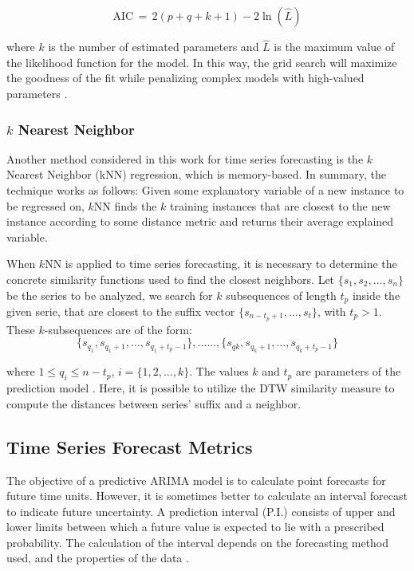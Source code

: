\begin{equation}
\mathrm{AIC} \, = \, 2(p + q+ k + 1)-2\ln(\hat L)
\end{equation}

where $k$ is the number of estimated parameters and $\hat{L}$ is the maximum value of the likelihood function for the model. In this way, the grid search will maximize the goodness of the fit while penalizing complex models with high-valued parameters \cite{Hyndman2018}.

\subsubsection{$k$ Nearest Neighbor}
\label{Sec:TheorykNN}

Another method considered in this work for time series forecasting is the $k$ Nearest Neighbor (kNN) regression, which is memory-based. In summary, the technique works as follows: Given some explanatory variable of a new instance to be regressed on, $k$NN finds the $k$ training instances that are closest to the new instance according to some distance metric and returns their average explained variable.

When $k$NN is applied to time series forecasting, it is necessary to determine the concrete similarity functions used to find the closest neighbors. Let $\{s_{1}, s_{2}, \ldots, s_{n}\}$ be the series to be analyzed, we search for $k$ subsequences of length $t_p$ inside the given serie, that are closest to the suffix vector $\{s_{n-t_{p}+1},\ldots, s_{t}\}$, with $t_{p} >1$. These $k$-subsequences are of the form: 
\begin{equation*}
    \{s_{q_{1}}, s_{q_{1}+1}, \ldots, s_{q_{1}+t_{p}-1} \}, \ldots \ldots, \{s_{q{k}}, s_{q_{k}+1}, \ldots, s_{q_{k} + t_{p}-1} \}
\end{equation*}

where $1 \leq q_{i} \leq n-t_{p}$, $i = \{1, 2, \ldots, k\}$. The values $k$ and $t_{p}$ are parameters of the prediction model \cite{Ban2013}. Here, it is possible to utilize the DTW similarity measure to compute the distances between series' suffix and a neighbor.

\subsection{Time Series Forecast Metrics}
\label{Sec:ErrorTSA}
The objective of a predictive ARIMA model is to calculate point forecasts for future time units. However, it is sometimes better to calculate an interval forecast to indicate future uncertainty. A prediction interval (P.I.) consists of upper and lower limits between which a future value is expected to lie with a prescribed probability. The calculation of the interval depends on the forecasting method used, and the properties of the data \cite{Chatfield2001}.

